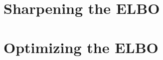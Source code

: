 \documentclass{article}
\begin{document}
\section{Sharpening the ELBO}

\section{Optimizing the ELBO}
\end{document}
